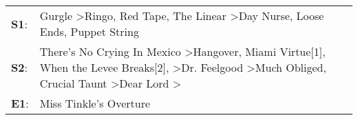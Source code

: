 \begin{supertabular}{p{0.03\textwidth}p{0.92\textwidth}}
 \textbf{S1}:  &                                                                                                                                                                                                Gurgle\textsuperscript{} \textgreater \enspace Ringo\textsuperscript{}, \enspace Red Tape\textsuperscript{}, \enspace The Linear\textsuperscript{} \textgreater \enspace Day Nurse\textsuperscript{}, \enspace Loose Ends\textsuperscript{}, \enspace Puppet String\textsuperscript{}  \enspace  \\
 \textbf{S2}:  &  There's No Crying In Mexico\textsuperscript{} \textgreater \enspace Hangover\textsuperscript{}, \enspace Miami Virtue[1]\textsuperscript{}, \enspace When the Levee Breaks[2]\textsuperscript{}, \textsuperscript{} \textgreater \enspace Dr. Feelgood\textsuperscript{} \textgreater \enspace Much Obliged\textsuperscript{}, \enspace Crucial Taunt\textsuperscript{} \textgreater \enspace Dear Lord\textsuperscript{} \textgreater {}\textsuperscript{}  \enspace  \\
 \textbf{E1}:  &                                                                                                                                                                                                                                                                                                                                                                                                                                             Miss Tinkle's Overture\textsuperscript{}  \enspace  \\
\end{supertabular}
